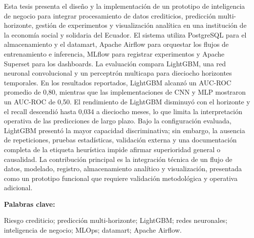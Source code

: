 Esta tesis presenta el diseño y la implementación de un prototipo de inteligencia de negocio para integrar procesamiento de datos crediticios, predicción multi-horizonte, gestión de experimentos y visualización analítica en una institución de la economía social y solidaria del Ecuador. El sistema utiliza PostgreSQL para el almacenamiento y el datamart, Apache Airflow para orquestar los flujos de entrenamiento e inferencia, MLflow para registrar experimentos y Apache Superset para los dashboards. La evaluación compara LightGBM, una red neuronal convolucional y un perceptrón multicapa para dieciocho horizontes temporales. En los resultados reportados, LightGBM alcanzó un AUC-ROC promedio de 0,80, mientras que las implementaciones de CNN y MLP mostraron un AUC-ROC de 0,50. El rendimiento de LightGBM disminuyó con el horizonte y el recall descendió hasta 0,034 a dieciocho meses, lo que limita la interpretación operativa de las predicciones de largo plazo. Bajo la configuración evaluada, LightGBM presentó la mayor capacidad discriminativa; sin embargo, la ausencia de repeticiones, pruebas estadísticas, validación externa y una documentación completa de la etiqueta heurística impide afirmar superioridad general o causalidad. La contribución principal es la integración técnica de un flujo de datos, modelado, registro, almacenamiento analítico y visualización, presentada como un prototipo funcional que requiere validación metodológica y operativa adicional.

\noindent\textbf{Palabras clave:}

Riesgo crediticio; predicción multi-horizonte; LightGBM; redes neuronales; inteligencia de negocio; MLOps; datamart; Apache Airflow.
